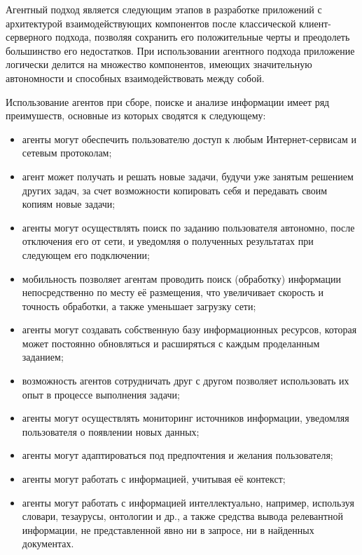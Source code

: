 Агентный подход является следующим этапов в разработке приложений с архитектурой взаимодействующих компонентов после классической клиент-серверного подхода, позволяя сохранить его положительные черты и преодолеть большинство его недостатков. При использовании агентного подхода приложение логически делится на множество компонентов, имеющих значительную автономности и способных взаимодействовать между собой.

Использование агентов при сборе, поиске и анализе информации имеет ряд преимушеств, основные из которых сводятся к следующему:
\begin{itemize}
\item агенты могут обеспечить пользователю доступ к любым Интернет-сервисам и сетевым протоколам;
\item агент может получать и решать новые задачи, будучи уже занятым решением других задач, за счет возможности копировать себя и передавать своим копиям новые задачи;
\item агенты могут осуществлять поиск по заданию пользователя автономно, после отключения его от сети, и уведомляя о полученных результатах при следующем его подключении;
\item мобильность позволяет агентам проводить поиск (обработку) информации непосредственно по месту её размещения, что увеличивает скорость и точность обработки, а также уменьшает загрузку сети;
\item агенты могут создавать собственную базу информационных ресурсов, которая может постоянно обновляться и расширяться с каждым проделанным заданием;
\item возможность агентов сотрудничать друг с другом позволяет использовать их опыт в процессе выполнения задачи;
\item агенты могут осуществлять мониторинг источников информации, уведомляя пользователя о появлении новых данных;
\item агенты могут адаптироваться под предпочтения и желания пользователя;
\item агенты могут работать с информацией, учитывая её контекст;
\item агенты могут работать с информацией интеллектуально, например, используя словари, тезаурусы, онтологии и др., а также средства вывода релевантной информации, не представленной явно ни в запросе, ни в найденных документах.
\end{itemize}

